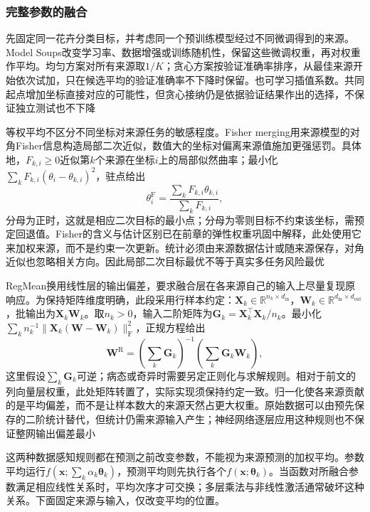 \subsubsection{完整参数的融合}
\label{sec:ket-integration-full-weights}

先固定同一花卉分类目标，并考虑同一个预训练模型经过不同微调得到的来源。Model Soups改变学习率、数据增强或训练随机性，保留这些微调权重，再对权重作平均。均匀方案对所有来源取$1/K$；贪心方案按验证准确率排序，从最佳来源开始依次试加，只在候选平均的验证准确率不下降时保留。也可学习插值系数。共同起点增加坐标直接对应的可能性，但贪心接纳仍是依据验证结果作出的选择，不保证独立测试也不下降

等权平均不区分不同坐标对来源任务的敏感程度。Fisher merging用来源模型的对角Fisher信息构造局部二次近似，数值大的坐标对偏离来源值施加更强惩罚。具体地，$F_{k,i}\geq0$近似第$k$个来源在坐标$i$上的局部似然曲率；最小化$\sum_k F_{k,i}(\theta_i-\theta_{k,i})^2$，驻点给出
\[
  \theta_i^{\mathrm{F}}
  =\frac{\sum_k F_{k,i}\theta_{k,i}}
         {\sum_k F_{k,i}},
\]
分母为正时，这就是相应二次目标的最小点；分母为零则目标不约束该坐标，需预定回退值。Fisher的含义与估计区别已在前章的弹性权重巩固中解释，此处使用它来加权来源，而不是约束一次更新。统计必须由来源数据估计或随来源保存，对角近似也忽略相关方向。因此局部二次目标最优不等于真实多任务风险最优

RegMean换用线性层的输出偏差，要求融合层在各来源自己的输入上尽量复现原响应。为保持矩阵维度明确，此段采用行样本约定：$\bm{X}_k\in\mathbb{R}^{n_k\times d_{\mathrm{in}}}$，$\bm{W}_k\in\mathbb{R}^{d_{\mathrm{in}}\times d_{\mathrm{out}}}$，批输出为$\bm{X}_k\bm{W}_k$。取$n_k>0$，输入二阶矩阵为$\bm{G}_k=\bm{X}_k^\top\bm{X}_k/n_k$。最小化$\sum_k n_k^{-1}\lVert\bm{X}_k(\bm{W}-\bm{W}_k)\rVert_{\mathrm{F}}^2$，正规方程给出
\[
  \bm W^{\mathrm{R}}
  =\left(\sum_k\bm G_k\right)^{-1}
    \left(\sum_k\bm G_k\bm W_k\right),
\]
这里假设$\sum_k\bm{G}_k$可逆；病态或奇异时需要另定正则化与求解规则。相对于前文的列向量层权重，此处矩阵转置了，实际实现须保持约定一致。归一化使各来源贡献的是平均偏差，而不是让样本数大的来源天然占更大权重。原始数据可以由预先保存的二阶统计替代，但统计仍需来源输入产生；神经网络逐层应用这种规则也不保证整网输出偏差最小

这两种数据感知规则都在预测之前改变参数，不能视为来源预测的加权平均。参数平均运行$f(\bm{x};\sum_k\alpha_k\bm{\theta}_k)$，预测平均则先执行各个$f(\bm{x};\bm{\theta}_k)$。当函数对所融合参数满足相应线性关系时，平均次序才可交换；多层乘法与非线性激活通常破坏这种关系。下面固定来源与输入，仅改变平均的位置。


